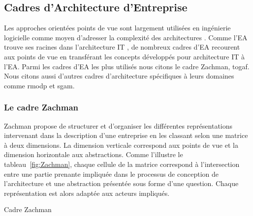\subsection{Cadres d'Architecture d'Entreprise}

Les approches orientées points de vue sont largement utilisées en ingénierie
logicielle comme moyen d'adresser la complexité des architectures
\cite{steen2004supporting}. Comme l'EA trouve ses racines dans l'architecture
IT \cite{winter2008enterprise}, de nombreux cadres d'EA recourent aux points de
vue en transférant les concepts développés pour architecture IT à l'EA. Parmi
les cadres d'EA les plus utilisés nous citons le cadre Zachman, \gls{togaf}. Nous citons aussi d'autres cadres d'architecture spécifiques à leurs domaines comme \gls{rmodp} et \gls{sgam}. 

\subsubsection{Le cadre Zachman}

Zachman \cite{zachman1987framework} propose de structurer et d'organiser les
différentes représentations intervenant dans la description d'une entreprise en
les classant selon une matrice à deux dimensions. La dimension verticale
correspond aux points de vue et la dimension horizontale aux abstractions.
Comme l'illustre le tableau~\ref{fig:Zachman}, chaque cellule de la matrice
correspond à l'intersection entre une partie prenante impliquée dans le
processus de conception de l'architecture et une abstraction présentée sous
forme d'une question. Chaque représentation est alors adaptée aux acteurs
impliqués. 

%
%
%

\begin{table}[!ht]
    \vspace*{0.4cm}
    
    \caption{Cadre Zachman \protect\cite{zachman1987framework}}
    \label{fig:Zachman}
\end{table}



